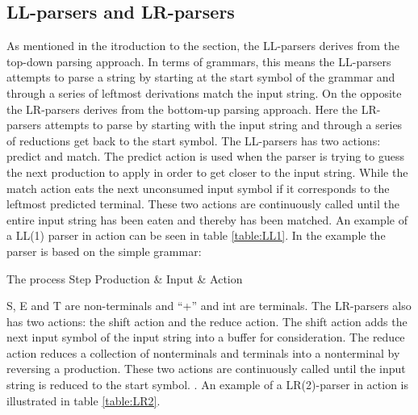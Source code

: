 \subsection{LL-parsers and LR-parsers}
\label{subsec:llparsersandlrparsers}
As mentioned in the itroduction to the section, the LL-parsers derives from the top-down parsing approach.
In terms of grammars, this means the LL-parsers attempts to parse a string by starting at the start symbol of 
the grammar and through a series of leftmost derivations match the
input string. On the opposite the LR-parsers derives from the bottom-up parsing
approach. Here the LR-parsers attempts to parse by starting with the input
string and through a series of reductions get back to the start symbol.
The LL-parsers has two actions: predict and match. The predict action is used
when the parser is trying to guess the next production to apply in order to get
closer to the input string. While the match action eats the next unconsumed
input symbol if it corresponds to the leftmost predicted terminal. These two
actions are continuously called until the entire input string has been eaten and
thereby has been matched. An example of a LL(1) parser in action can be seen in
table \ref{table:LL1}. In the example the parser is based on the simple grammar: 

\begin{centering}
\begin{ebnf}
\end{ebnf}
\end{centering}

	      {The process                                          }
{Step  	 }{Production & Input       & Action                        }{
}

S, E and T are non-terminals and ``+'' and int are terminals. 
The LR-parsers also has two actions: the shift action and the reduce action. The
shift action adds the next input symbol of the input string into a buffer for
consideration. The reduce action reduces a collection of nonterminals and
terminals into a nonterminal by reversing a production. These two actions are
continuously called until the input string is reduced to the start symbol.
\cite{LL(1)andLR(2)inaction}. An example of a LR(2)-parser in action is
illustrated in table \ref{table:LR2}.


